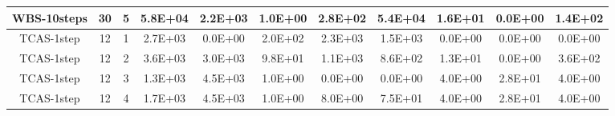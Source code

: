 \begin{table*}[]
\begin{tabular}{@{}ccccccccccc@{}}
        WBS-10steps                                              & 30                                                         & 5    & 5.8E+04                                                     & 2.2E+03                                                               & 1.0E+00                                                 & 2.8E+02                                                    & 5.4E+04                                                        & 1.6E+01                                                   & 0.0E+00                                                   & 1.4E+02 \\ \midrule \midrule
        TCAS-1step                                               & 12                                                         & 1    & 2.7E+03                                                     & 0.0E+00                                                               & 2.0E+02                                                 & 2.3E+03                                                    & 1.5E+03                                                        & 0.0E+00                                                   & 0.0E+00                                                   & 0.0E+00 \\ \midrule
        TCAS-1step                                               & 12                                                         & 2    & 3.6E+03                                                     & 3.0E+03                                                               & 9.8E+01                                                 & 1.1E+03                                                    & 8.6E+02                                                        & 1.3E+01                                                   & 0.0E+00                                                   & 3.6E+02 \\ \midrule
        TCAS-1step                                               & 12                                                         & 3    & 1.3E+03                                                     & 4.5E+03                                                               & 1.0E+00                                                 & 0.0E+00                                                    & 0.0E+00                                                        & 4.0E+00                                                   & 2.8E+01                                                   & 4.0E+00 \\ \midrule
        TCAS-1step                                               & 12                                                         & 4    & 1.7E+03                                                     & 4.5E+03                                                               & 1.0E+00                                                 & 8.0E+00                                                    & 7.5E+01                                                        & 4.0E+00                                                   & 2.8E+01                                                   & 4.0E+00 \\ \midrule

\end{tabular}
\end{table*}
